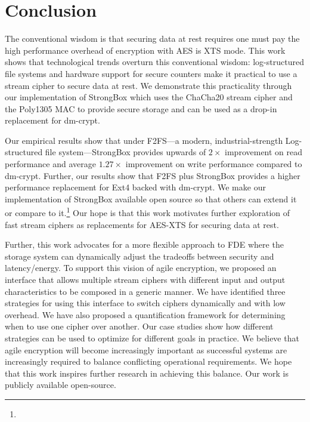 \chapter{Conclusion} \label{chp:conclusion}

The conventional wisdom is that securing data at rest requires one must pay the
high performance overhead of encryption with AES is XTS mode. This work shows
that technological trends overturn this conventional wisdom: log-structured file
systems and hardware support for secure counters make it practical to use a
stream cipher to secure data at rest. We demonstrate this practicality through
our implementation of StrongBox which uses the ChaCha20 stream cipher and the
Poly1305 MAC to provide secure storage and can be used as a drop-in replacement
for dm-crypt.

Our empirical results show that under F2FS---a modern, industrial-strength
Log-structured file system---StrongBox provides upwards of $2\times$ improvement
on read performance and average $1.27\times$ improvement on write performance
compared to dm-crypt. Further, our results show that F2FS plus StrongBox
provides a higher performance replacement for Ext4 backed with dm-crypt. We make
our implementation of StrongBox available open source so that others can extend
it or compare to it.\footnote{\StrongBoxURI} Our hope is that this work
motivates further exploration of fast stream ciphers as replacements for AES-XTS
for securing data at rest.

Further, this work advocates for a more flexible approach to FDE where the
storage system can dynamically adjust the tradeoffs between security and
latency/energy. To support this vision of agile encryption, we proposed an
interface that allows multiple stream ciphers with different input and output
characteristics to be composed in a generic manner. We have identified three
strategies for using this interface to switch ciphers dynamically and with low
overhead. We have also proposed a quantification framework for determining when
to use one cipher over another. Our case studies show how different strategies
can be used to optimize for different goals in practice. We believe that agile
encryption will become increasingly important as successful systems are
increasingly required to balance conflicting operational requirements. We hope
that this work inspires further research in achieving this balance. Our work is
publicly available open-source.


